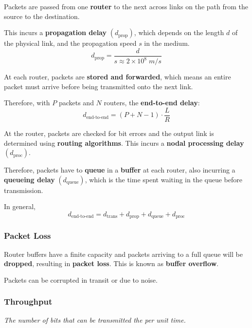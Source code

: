Packets are passed from one \textbf{router} to the next across links on the path from the source to the destination.

This incurs a \textbf{propagation delay} $\left(d_{\text{prop}}\right)$, which depends on the length $d$ of the physical link,
and the propagation speed $s$ in the medium.\\
\begin{equation*}
    d_{\text{prop}} = \frac{d}{s \approx 2 \times 10^8 \; m/s}
\end{equation*}

At each router, packets are \textbf{stored and forwarded}, which means an entire packet must arrive before being
transmitted onto the next link.

Therefore, with $P$ packets and $N$ routers, the \textbf{end-to-end delay}:\\
\begin{equation*}
    d_{\text{end-to-end}} = (P + N - 1) \cdot \frac{L}{R}
\end{equation*}

At the router, packets are checked for bit errors and the output link is determined using \textbf{routing algorithms}.
This incurs a \textbf{nodal processing delay} $\left(d_{\text{proc}}\right)$.

Therefore, packets have to \textbf{queue} in a \textbf{buffer} at each router,
also incurring a \textbf{queueing delay} $\left(d_{\text{queue}}\right)$, which is the time spent waiting in the
queue before transmission.

In general,\\
\begin{equation*}
    d_{\text{end-to-end}} = d_{\text{trans}} + d_{\text{prop}} + d_{\text{queue}} + d_{\text{proc}} 
\end{equation*}

\subsubsection{Packet Loss}
Router buffers have a finite capacity and packets arriving to a full queue will be \textbf{dropped},
resulting in \textbf{packet loss}.
This is known as \textbf{buffer overflow}.

Packets can be corrupted in transit or due to noise.

\subsubsection{Throughput}
\emph{The number of bits that can be transmitted the per unit time.}


